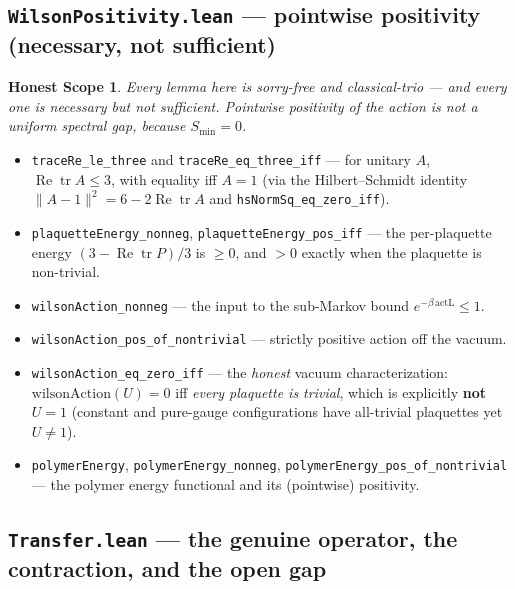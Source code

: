 \documentclass[11pt]{article}
\newtheorem*{honest}{Honest Scope}
\newcommand{\code}[1]{\texttt{#1}}
\begin{document}
\subsection{\code{WilsonPositivity.lean} --- pointwise positivity (necessary, not sufficient)}

\begin{honest}
Every lemma here is sorry-free and classical-trio --- and every one
is \emph{necessary but not sufficient}. Pointwise positivity of the
action is not a uniform spectral gap, because $S_{\min}=0$.
\end{honest}

\begin{itemize}
  \item \code{traceRe\_le\_three} and \code{traceRe\_eq\_three\_iff}
        --- for unitary $A$, $\operatorname{Re}\operatorname{tr}A \le 3$,
        with equality iff $A=1$ (via the Hilbert--Schmidt identity
        $\lVert A-1\rVert^2 = 6 - 2\operatorname{Re}\operatorname{tr}A$
        and \code{hsNormSq\_eq\_zero\_iff}).
  \item \code{plaquetteEnergy\_nonneg},
        \code{plaquetteEnergy\_pos\_iff} --- the per-plaquette energy
        $(3-\operatorname{Re}\operatorname{tr}P)/3$ is $\ge 0$, and
        $>0$ exactly when the plaquette is non-trivial.
  \item \code{wilsonAction\_nonneg} --- the input to the sub-Markov
        bound $e^{-\beta\,\mathrm{actL}}\le 1$.
  \item \code{wilsonAction\_pos\_of\_nontrivial} --- strictly positive
        action off the vacuum.
  \item \code{wilsonAction\_eq\_zero\_iff} --- the \emph{honest}
        vacuum characterization: $\mathrm{wilsonAction}(U)=0$ iff
        \emph{every plaquette is trivial}, which is explicitly
        \textbf{not} $U=1$ (constant and pure-gauge configurations
        have all-trivial plaquettes yet $U\neq 1$).
  \item \code{polymerEnergy}, \code{polymerEnergy\_nonneg},
        \code{polymerEnergy\_pos\_of\_nontrivial} --- the polymer
        energy functional and its (pointwise) positivity.
\end{itemize}

\subsection{\code{Transfer.lean} --- the genuine operator, the contraction, and the open gap}
\end{document}
